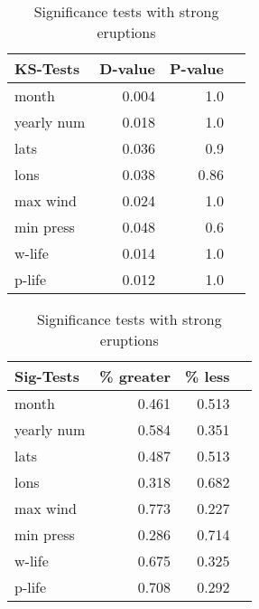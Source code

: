 \documentclass[phd,tocprelim]{cornell}
\begin{document}
\begin{table}[!tbp]
\centering
\begin{minipage}[b]{0.45\textwidth}
\begin{tabular}{lrrr}
\toprule
             KS-Tests & D-value & P-value \\
\midrule
month & 0.004 & 1.0 \\
yearly num & 0.018 & 1.0 \\
lats & 0.036 & 0.9 \\
lons & 0.038 & 0.86 \\
max wind & 0.024 & 1.0 \\
min press & 0.048 & 0.6 \\
w-life & 0.014 & 1.0 \\
p-life & 0.012 & 1.0 \\

\bottomrule
\end{tabular}
\caption{KS-tests with strong eruptions}
\label{ks:10}
\end{minipage}
\hfill
\begin{minipage}[b]{0.45\textwidth}
\begin{tabular}{lrrr}
\toprule
             Sig-Tests & \% greater & \% less \\
\midrule

month & 0.461 & 0.513 \\
yearly num & 0.584 & 0.351 \\
lats & 0.487 & 0.513 \\
lons & 0.318 & 0.682 \\
max wind & 0.773 & 0.227 \\
min press & 0.286 & 0.714 \\
w-life & 0.675 & 0.325 \\
p-life & 0.708 & 0.292 \\

\bottomrule
\end{tabular}
\caption{Significance tests with strong eruptions}
\label{sig:10}
\end{minipage}
\end{table}
\end{document}

